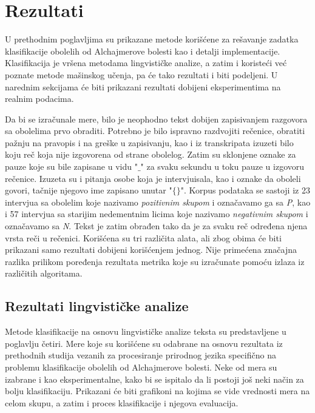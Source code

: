 \documentclass[12pt,oneside]{memoir}
\begin{document}
\chapter{Rezultati}

U prethodnim poglavljima su prikazane metode korišćene za rešavanje zadatka klasifikacije obolelih od Alchajmerove bolesti kao i detalji implementacije.  Klasifikacija je vršena metodama lingvističke analize, a zatim i koristeći već poznate metode mašinskog učenja, pa će tako rezultati i biti podeljeni.  U narednim sekcijama će biti prikazani rezultati dobijeni eksperimentima na realnim podacima. 

Da bi se izračunale mere, bilo je neophodno tekst dobijen zapisivanjem razgovora sa obolelima prvo obraditi. Potrebno je bilo ispravno razdvojiti rečenice, obratiti pažnju na pravopis i na greške u zapisivanju, kao i iz transkripata izuzeti bilo koju reč koja nije izgovorena od strane obolelog. Zatim su sklonjene oznake za pauze koje su bile zapisane u vidu "$\_$" za svaku sekundu u toku pauze u izgovoru rečenice.  Izuzeta su i pitanja osobe koja je intervjuisala, kao i oznake da oboleli govori, tačnije njegovo ime zapisano unutar "$\{\}$".  Korpus podataka se sastoji iz 23 intervjua sa obolelim koje nazivamo \textit{pozitivnim skupom} i označavamo ga sa \textit{P},  kao i 57 intervjua sa starijim nedementnim licima koje nazivamo \textit{negativnim skupom} i označavamo sa \textit{N}. 
Tekst je zatim obrađen tako da je za svaku reč određena njena vrsta reči u rečenici.  Korišćena su tri različita alata, ali zbog obima će biti prikazani samo rezultati dobijeni korišćenjem jednog.  Nije primećena značajna razlika prilikom poređenja rezultata metrika koje su izračunate pomoću izlaza iz različitih algoritama.  
\newpage
\section{Rezultati lingvističke analize}

Metode klasifikacije na osnovu lingvističke analize teksta su predstavljene u poglavlju četiri.  Mere koje su korišćene su odabrane na osnovu rezultata iz prethodnih studija vezanih za procesiranje prirodnog jezika specifično na problemu klasifikacije obolelih od Alchajmerove bolesti. Neke od mera su izabrane i kao eksperimentalne, kako bi se ispitalo da li postoji još neki način za bolju klasifikaciju.  Prikazani će biti grafikoni na kojima se vide vrednosti mera na celom skupu, a zatim i proces klasifikacije i njegova evaluacija. 
\end{document}
